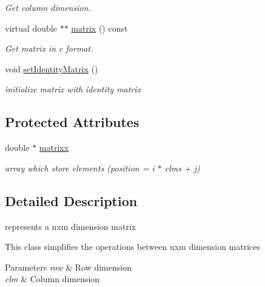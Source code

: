 \begin{DoxyCompactItemize}
\begin{DoxyCompactList}\small\item\em Get column dimension. \end{DoxyCompactList}\item 
virtual double $\ast$$\ast$ \hyperlink{classavr_matrix_af06d1669ec6c8f2be5e2d2cf421e1dcd}{matrix} () const 
\begin{DoxyCompactList}\small\item\em Get matrix in c format. \end{DoxyCompactList}\item 
\hypertarget{classavr_matrix_a309f5af755f83a47327e6e88034d0680}{void \hyperlink{classavr_matrix_a309f5af755f83a47327e6e88034d0680}{set\-Identity\-Matrix} ()}\label{classavr_matrix_a309f5af755f83a47327e6e88034d0680}

\begin{DoxyCompactList}\small\item\em initialize matrix with identity matrix \end{DoxyCompactList}\end{DoxyCompactItemize}
\subsection*{Protected Attributes}
\begin{DoxyCompactItemize}
\item 
\hypertarget{classavr_matrix_acc47cfe71e4829cae8a64b29c15463da}{double $\ast$ \hyperlink{classavr_matrix_acc47cfe71e4829cae8a64b29c15463da}{matrixx}}\label{classavr_matrix_acc47cfe71e4829cae8a64b29c15463da}

\begin{DoxyCompactList}\small\item\em array which store elements (position = i $\ast$ clms + j) \end{DoxyCompactList}\end{DoxyCompactItemize}


\subsection{Detailed Description}
represents a nxm dimension matrix 

This class simplifies the operations between nxm dimension matrices 
\begin{DoxyParams}{Parameters}
{\em row} & Row dimension \\
\hline
{\em clm} & Column dimension \\
\hline
\end{DoxyParams}


